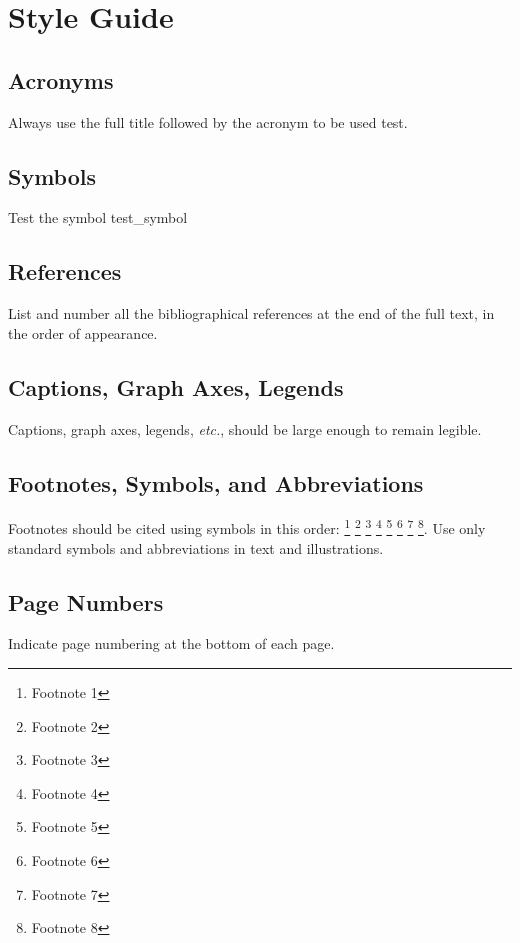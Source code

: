 \documentclass[]{iac}
\begin{document}
\section{Style Guide}

\subsection{Acronyms}
Always use the full title followed by the acronym to be used \acrfull{test}.

\subsection{Symbols}
Test the symbol \gls{test_symbol}

\subsection{References}
List and number all the bibliographical references at the end of the full text, in the order of appearance.\cite{Geim2001}

\subsection{Captions, Graph Axes, Legends}
Captions, graph axes, legends, \textit{etc.}, should be large enough to remain legible.

\subsection{Footnotes, Symbols, and Abbreviations}
Footnotes should be cited using symbols in this order: \footnote{Footnote 1} \footnote{Footnote 2} \footnote{Footnote 3} \footnote{Footnote 4} \footnote{Footnote 5} \footnote{Footnote 6} \footnote{Footnote 7} \footnote{Footnote 8}. Use only standard symbols and abbreviations in text and illustrations.

\subsection{Page Numbers}
Indicate page numbering at the bottom of each page.



\end{document}
